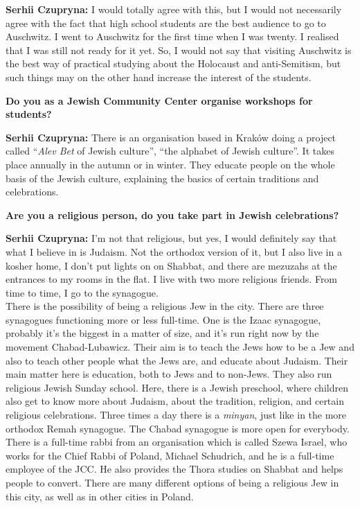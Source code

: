 \textbf{Serhii Czupryna:} I would totally agree with this, but I would not necessarily agree with the fact that high school students are the best audience to go to Auschwitz. I went to Auschwitz for the first time when I was twenty. I realised that I was still not ready for it yet. So, I would not say that visiting Auschwitz is the best way of practical studying about the Holocaust and anti-Semitism, but such things may on the other hand increase the interest of the students.\par  
\textbf{Do you as a Jewish Community Center organise workshops for students?} \par  
\textbf{Serhii Czupryna:} There is an organisation based in Kraków doing a project called ``\textit{Alev Bet} of Jewish culture'', ``the alphabet of Jewish culture''. It takes place annually in the autumn or in winter. They educate people on the whole basis of the Jewish culture, explaining the basics of certain traditions and celebrations.\par 
\textbf{Are you a religious person, do you take part in Jewish celebrations?} \par
\textbf{Serhii Czupryna:} I’m not that religious, but yes, I would definitely say that what I believe in is Judaism. Not the orthodox version of it, but I also live in a kosher home, I don’t put lights on on Shabbat, and there are mezuzahs at the entrances to my rooms in the flat. I live with two more religious friends. From time to time, I go to the synagogue. \\
There is the possibility of being a religious Jew in the city. There are three synagogues functioning more or less full-time. One is the Izaac synagogue, probably it’s the biggest in a matter of size, and it’s run right now by the movement Chabad-Lubawicz. Their aim is to teach the Jews how to be a Jew and also to teach other people what the Jews are, and educate about Judaism. Their main matter here is education, both to Jews and to non-Jews. They also run religious Jewish Sunday school. Here, there is a Jewish preschool, where children also get to know more about Judaism, about the tradition, religion, and certain religious celebrations. Three times a day there is a \textit{minyan}, just like in the more orthodox Remah synagogue. The Chabad synagogue is more open for everybody. There is a full-time rabbi from an organisation which is called Szewa Israel, who works for the Chief Rabbi of Poland, Michael Schudrich, and he is a full-time employee of the JCC. He also provides the Thora studies on Shabbat and helps people to convert. There are many different options of being a religious Jew in this city, as well as in other cities in Poland.\par  
